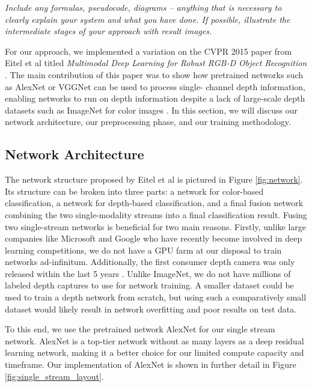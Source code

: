 
\textit{Include any formulas, pseudocode, diagrams -- anything that is
necessary to clearly explain your system and what you have done. If possible,
illustrate the intermediate stages of your approach with result images.}

For our approach, we implemented a variation on the CVPR 2015 paper from Eitel
et al titled \textit{Multimodal Deep Learning for Robust RGB-D Object
Recognition} \cite{Eitel2015}. The main contribution of this paper was to show how
pretrained networks such as AlexNet or VGGNet can be used to process single-
channel depth information, enabling networks to run on depth information
despite a lack of large-scale depth datasets such as ImageNet for color images
\cite{ImageNet2015}. In this section, we will discuss our network architecture, our
preprocessing phase, and our training methodology.


\subsection{Network Architecture}

The network structure proposed by Eitel et al \cite{Eitel2015} is pictured in Figure
\ref{fig:network}. Its structure can be broken into three parts: a network for
color-based classification, a network for depth-based classification, and a
final fusion network combining the two single-modality streams into a final
classification result. Fusing two single-stream networks is beneficial for two
main reasons. Firstly, unlike large companies like Microsoft and Google who
have recently become involved in deep learning competitions, we do not have a
GPU farm at our disposal to train networks ad-infinitum. Additionally, the
first consumer depth camera was only released within the last 5 years \cite{Alex2009_kinect}. Unlike ImageNet, we do not have millions of labeled depth captures to
use for network training. A smaller dataset could be used to train a depth
network from scratch, but using such a comparatively small dataset would
likely result in network overfitting and poor results on test data.

To this end, we use the pretrained network AlexNet for our single stream
network. AlexNet is a top-tier network without as many layers as a deep
residual learning network, making it a better choice for our limited compute
capacity and timeframe. Our implementation of AlexNet is shown in further
detail in Figure \ref{fig:single_stream_layout}. 


